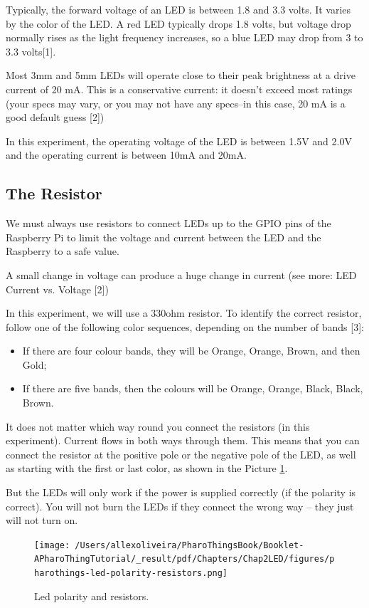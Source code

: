 \documentclass[10pt,twoside,english]{_support/latex/sbabook/sbabook}
\begin{document}
Typically, the forward voltage of an LED is between 1.8 and 3.3 volts. It varies by the color of the LED. A red LED typically drops 1.8 volts, but voltage drop normally rises as the light frequency increases, so a blue LED may drop from 3 to 3.3 volts{[}1{]}.

Most 3mm and 5mm LEDs will operate close to their peak brightness at a drive current of 20 mA. This is a conservative current: it doesn’t exceed most ratings (your specs may vary, or you may not have any specs–in this case, 20 mA is a good default guess {[}2{]})

In this experiment, the operating voltage of the LED is between 1.5V and 2.0V and the operating current is between 10mA and 20mA.
\subsection{The Resistor}
We must always use resistors to connect LEDs up to the GPIO pins of the Raspberry Pi to limit the voltage and current between the LED and the Raspberry to a safe value.

A small change in voltage can produce a huge change in current (see more: LED Current vs. Voltage {[}2{]})

In this experiment, we will use a 330ohm resistor. To identify the correct resistor, follow one of the following color sequences, depending on the number of bands {[}3{]}:

\begin{itemize}
\item If there are four colour bands, they will be Orange, Orange, Brown, and then Gold;
\item If there are five bands, then the colours will be Orange, Orange, Black, Black, Brown.
\end{itemize}

It does not matter which way round you connect the resistors (in this experiment). Current flows in both ways through them. This means that you can connect the resistor at the positive pole or the negative pole of the LED, as well as starting with the first or last color, as shown in the Picture \ref{Ledpolarity}.

But the LEDs will only work if the power is supplied correctly (if the polarity is correct). You will not burn the LEDs if they connect the wrong way – they just will not turn on.


\begin{figure}

\begin{center}
\texttt{[image: /Users/allexoliveira/PharoThingsBook/Booklet-APharoThingTutorial/\_result/pdf/Chapters/Chap2LED/figures/pharothings-led-polarity-resistors.png]}\caption{Led polarity and resistors.\label{Ledpolarity}}\end{center}
\end{figure}
\end{document}
